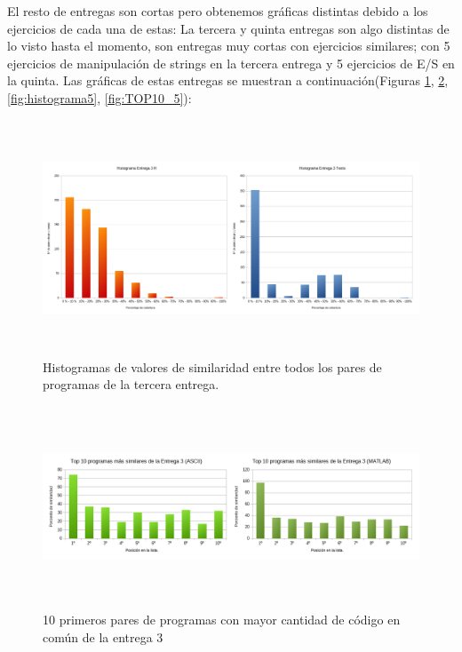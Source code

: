 \bigskip
El resto de entregas son cortas pero obtenemos gráficas distintas debido a los ejercicios de cada una de estas:
\newline
La tercera y quinta entregas son algo distintas de lo visto hasta el momento, son entregas muy cortas con ejercicios similares; con 5 ejercicios de manipulación de strings en la tercera entrega y 5 ejercicios de E/S en la quinta.
\newline
Las gráficas de estas entregas se muestran a continuación(Figuras \ref{fig:histograma3}, \ref{fig:TOP10_3}, \ref{fig:histograma5}, \ref{fig:TOP10_5}):



\begin{figure}[H] %
\centering
\includegraphics[width=15cm, height=7cm]{imagenes/histograma3.png}  %
\caption{Histogramas de valores de similaridad entre todos los pares de programas de la tercera entrega.} \label{fig:histograma3}
\end{figure}


\begin{figure}[H] %
\centering
\includegraphics[width=14cm, height=6cm]{imagenes/TOP10_3.png}  %
\caption{10 primeros pares de programas con mayor cantidad de código en común de la entrega 3} \label{fig:TOP10_3}
\end{figure}


